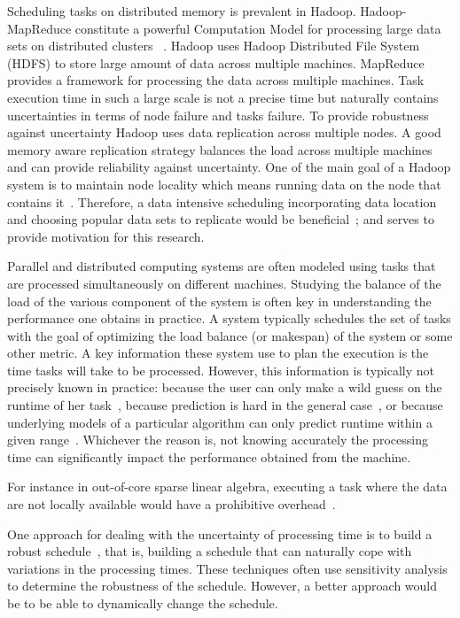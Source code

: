 Scheduling tasks on distributed memory is prevalent in Hadoop. Hadoop-MapReduce constitute a powerful Computation Model for processing large data sets on distributed clusters~\cite{DBLP:journals/corr/abs-1207-0780} . Hadoop uses Hadoop Distributed File System (HDFS) to store large amount of data across multiple machines. MapReduce provides a framework for processing the data across multiple machines. Task execution time in such a large scale is not a precise time but naturally contains uncertainties in terms of node failure and tasks failure. To provide robustness against uncertainty Hadoop uses data replication across multiple nodes. A good memory aware replication strategy balances the load across multiple machines and can provide reliability against uncertainty. One of the main goal of a Hadoop system is to maintain node locality which means running data on the node that contains it~\cite{Zaharia:EECS-2009-55}. Therefore, a data intensive scheduling incorporating data location  and choosing popular data sets to replicate would be beneficial~\cite{Guo:2012:IDL:2310096.2310222}; and serves to provide motivation for this research.


 Parallel and distributed computing systems are often modeled using
 tasks that are processed simultaneously on different
 machines. Studying the balance of the load of the various component of
 the system is often key in understanding the performance one obtains
 in practice. A system typically schedules the set of tasks with the
 goal of optimizing the load balance (or makespan) of the system or
 some other metric. A key information these system use to plan the
 execution is the time tasks will take to be processed. However, this
 information is typically not precisely known in practice: because the
 user can only make a wild guess on the runtime of her
 task~\cite{Luong2008}, because prediction is hard in the general
 case~\cite{Wilhelm2008}, or because underlying models of a particular
 algorithm can only predict runtime within a given
 range~\cite{Erlebacher14-ICS}. Whichever the reason is, not knowing
 accurately the processing time can significantly impact the
 performance obtained from the machine.
 
 For instance in out-of-core sparse
 linear algebra, executing a task where the data are not locally
 available would have a prohibitive
 overhead~\cite{Zhou12-Cluster,Zhou12-P2S2}.
 
 One approach for dealing with the uncertainty of processing time is to
 build a robust schedule~\cite{cj09c,Gatto07,
   Davenport_slack-based techniques}, that is, building a schedule that
 can naturally cope with variations in the processing times. These
 techniques often use sensitivity analysis to determine the robustness
 of the schedule. However, a better approach would be to be able to
 dynamically change the schedule. 
 
